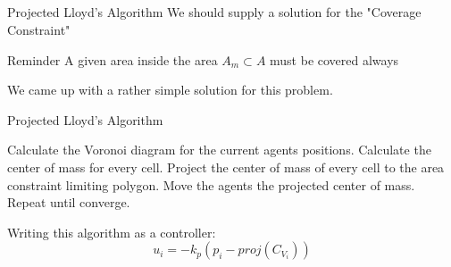 \documentclass[t]{beamer}
\begin{document}
\subsection[Projected Lloyd's Algorithm]{}
\begin{frame}[label=projlloydsalgo1]{Projected Lloyd's Algorithm}
We should supply a solution for the "Coverage Constraint" \pause
\begin{block}{Reminder}
A given area inside the area $A_{m} \subset A$ must be covered always
\end{block}\pause
We came up with a rather simple solution for this problem.
\end{frame}

\begin{frame}[label=projlloydsalgo2]{Projected Lloyd's Algorithm}
\begin{algorithm}[H]
\caption{Projected Lloyd's Algorithm (PLA)}\label{ProjLloydsAlgorithm}
\begin{algorithmic}[1]
\State Calculate the Voronoi diagram for the current agents positions.
\State Calculate the center of mass for every cell.
\State Project the center of mass of every cell to the area constraint limiting polygon.
\State Move the agents the projected center of mass.
\State Repeat until converge.
\end{algorithmic}
\end{algorithm}

Writing this algorithm as a controller:
\begin{equation} \label{ProjectedLloydsContol}
u_{i} = -k_{p}\left( p_i - \textit{proj}\left( C_{V_{i}} \right) \right)
\end{equation} 
\end{frame}
\end{document}
